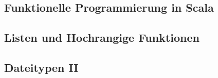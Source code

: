 \subsection{Funktionelle Programmierung in Scala}

\subsection{Listen und Hochrangige Funktionen}

\subsection{Dateitypen II}